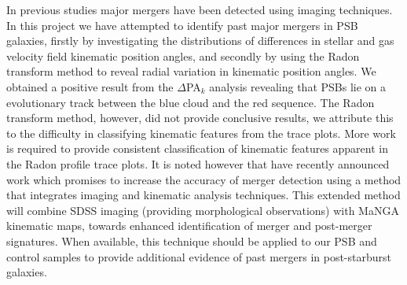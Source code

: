 In previous studies major mergers have been detected using imaging techniques. In this project we have attempted to identify past major mergers in PSB galaxies, firstly by investigating the distributions of differences in stellar and gas velocity field kinematic position angles, and secondly by using the Radon transform method to reveal radial variation in kinematic position angles. 
We obtained a positive result from the $\Delta$PA$_{k}$ analysis revealing that PSBs lie on a evolutionary track between the blue cloud and the red sequence. The Radon transform method, however, did not provide conclusive results, we attribute this to the difficulty in classifying kinematic features from the trace plots. More work is required to provide consistent classification of kinematic features apparent in the Radon profile trace plots. It is noted however that \cite{2019DDA....5020304N} have recently announced work which promises to increase the accuracy of merger detection using a method that integrates imaging and kinematic analysis techniques. This extended method will combine SDSS imaging (providing morphological observations) with MaNGA  kinematic maps, towards enhanced identification of merger and post-merger signatures. When available, this technique should be applied to our PSB and control samples to provide additional evidence of past mergers in post-starburst galaxies.
